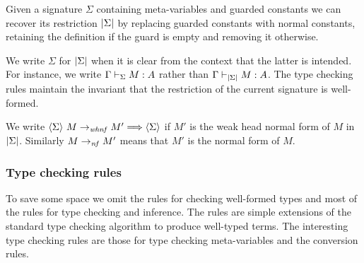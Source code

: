 \begin{definition}
    Given a signature $\Sigma$ containing meta-variables and guarded constants
    we can recover its {\Core} restriction $\left|{\Sigma}\right|$ by replacing
    guarded constants with normal constants, retaining the definition if the
    guard is empty and removing it otherwise.
\end{definition}

We write $\Sigma$ for $\left|{\Sigma}\right|$ when it is clear from the context that
the latter is intended. For instance, we write ${\Gamma} \vdash_{\Sigma} {M} : {A}$
rather than ${\Gamma} \vdash_{\left|{\Sigma}\right|} {M} : {A}$. The type checking rules
maintain the invariant that the {\Core} restriction of the current signature is
well-formed.

We write $\langle {\Sigma} \rangle ~ {{M} \to_{\mathit{whnf}} {M'}} \Longrightarrow \langle {\Sigma} \rangle$ if $M'$ is the weak
head normal form of $M$ in $\left|{\Sigma}\right|$. Similarly ${M} \to_{\mathit{nf}} {M'}$
means that $M'$ is the normal form of $M$.

\subsubsection{Type checking rules}

To save some space we omit the rules for checking well-formed types and most of
the rules for type checking and inference. The rules are simple extensions of
the standard type checking algorithm to produce
well-typed terms. The interesting type checking rules are those for type
checking meta-variables and the conversion rules.


